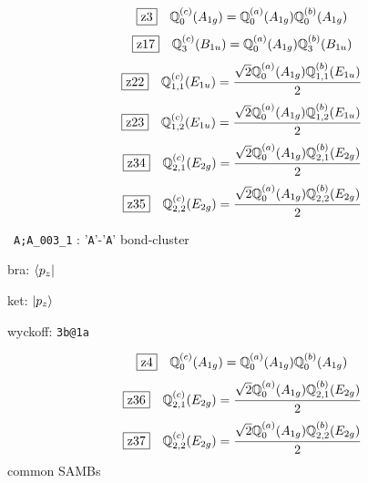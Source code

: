 \documentclass[fleqn,10pt,landscape]{jsarticle}
\begin{document}
\begin{dmath*}
\hspace*{3mm}\fbox{z3}\quad \mathbb{Q}_{0}^{(c)}(A_{1g})=\mathbb{Q}_{0}^{(a)}(A_{1g}) \mathbb{Q}_{0}^{(b)}(A_{1g})
\end{dmath*}
\begin{dmath*}
\hspace*{3mm}\fbox{z17}\quad \mathbb{Q}_{3}^{(c)}(B_{1u})=\mathbb{Q}_{0}^{(a)}(A_{1g}) \mathbb{Q}_{3}^{(b)}(B_{1u})
\end{dmath*}
\begin{dmath*}
\hspace*{3mm}\fbox{z22}\quad \mathbb{Q}_{1,1}^{(c)}(E_{1u})=\frac{\sqrt{2} \mathbb{Q}_{0}^{(a)}(A_{1g}) \mathbb{Q}_{1,1}^{(b)}(E_{1u})}{2}
\end{dmath*}
\begin{dmath*}
\hspace*{3mm}\fbox{z23}\quad \mathbb{Q}_{1,2}^{(c)}(E_{1u})=\frac{\sqrt{2} \mathbb{Q}_{0}^{(a)}(A_{1g}) \mathbb{Q}_{1,2}^{(b)}(E_{1u})}{2}
\end{dmath*}
\begin{dmath*}
\hspace*{3mm}\fbox{z34}\quad \mathbb{Q}_{2,1}^{(c)}(E_{2g})=\frac{\sqrt{2} \mathbb{Q}_{0}^{(a)}(A_{1g}) \mathbb{Q}_{2,1}^{(b)}(E_{2g})}{2}
\end{dmath*}
\begin{dmath*}
\hspace*{3mm}\fbox{z35}\quad \mathbb{Q}_{2,2}^{(c)}(E_{2g})=\frac{\sqrt{2} \mathbb{Q}_{0}^{(a)}(A_{1g}) \mathbb{Q}_{2,2}^{(b)}(E_{2g})}{2}
\end{dmath*}
\vspace{5mm}

\noindent\textbullet\, \texttt{A;A_003_1} : '\texttt{A}'-'\texttt{A}' bond-cluster

\noindent\quad * bra: $\bra{p_{z}}$

\noindent\quad * ket: $\ket{p_{z}}$

\noindent\quad * wyckoff: \texttt{3b@1a}

\begin{dmath*}
\hspace*{3mm}\fbox{z4}\quad \mathbb{Q}_{0}^{(c)}(A_{1g})=\mathbb{Q}_{0}^{(a)}(A_{1g}) \mathbb{Q}_{0}^{(b)}(A_{1g})
\end{dmath*}
\begin{dmath*}
\hspace*{3mm}\fbox{z36}\quad \mathbb{Q}_{2,1}^{(c)}(E_{2g})=\frac{\sqrt{2} \mathbb{Q}_{0}^{(a)}(A_{1g}) \mathbb{Q}_{2,1}^{(b)}(E_{2g})}{2}
\end{dmath*}
\begin{dmath*}
\hspace*{3mm}\fbox{z37}\quad \mathbb{Q}_{2,2}^{(c)}(E_{2g})=\frac{\sqrt{2} \mathbb{Q}_{0}^{(a)}(A_{1g}) \mathbb{Q}_{2,2}^{(b)}(E_{2g})}{2}
\end{dmath*}
\noindent * common SAMBs
\end{document}

